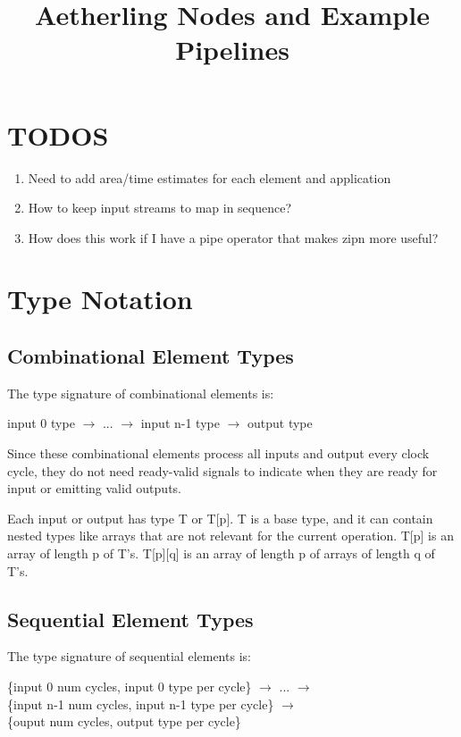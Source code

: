 \documentclass[11pt,fleqn]{article}
\numberwithin{equation}{subsection}
\begin{document}
\title{Aetherling Nodes and Example Pipelines}

\section{TODOS}
\begin{enumerate}
    \item Need to add area/time estimates for each element and application
    \item How to keep input streams to map in sequence?
    \item How does this work if I have a pipe operator that makes zipn more useful?
\end{enumerate}

\section{Type Notation}

\subsection{Combinational Element Types}
The type signature of combinational elements is:
\begin{adjustwidth}{2.5 em}{0 pt}
    input 0 type $\rightarrow$ ... $\rightarrow$ input n-1 type $\rightarrow$ output type
\end{adjustwidth}
Since these combinational elements process all inputs and output every 
clock cycle, they do not need ready-valid signals to indicate when they are
ready for input or emitting valid outputs.

Each input or output has type T or T[p]. T is a base type, and it can contain 
nested types like arrays that are not relevant for the current operation. T[p] 
is an array of length p of T's. T[p][q] is an array of length p of arrays of 
length q of T's.

\subsection{Sequential Element Types}
The type signature of sequential elements is:
\begin{adjustwidth}{2.5 em}{0 pt}
    \{input 0 num cycles, input 0 type per cycle\} $\rightarrow$ ...
    $\rightarrow$ \\
    \{input n-1 num cycles, input n-1 type per cycle\} $\rightarrow$ \\ 
    \{ouput num cycles, output type per cycle\}
\end{adjustwidth}
\end{document}
